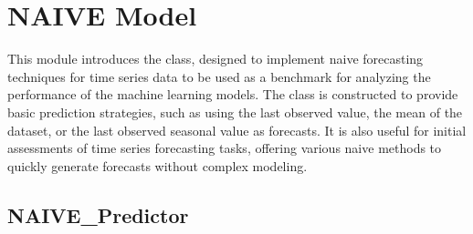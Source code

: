 \documentclass[letterpaper,10pt,english]{sphinxmanual}
\begin{document}
\sphinxstepscope


\section{NAIVE Model}
\label{\detokenize{docs/NAIVE_model:naive-model}}\label{\detokenize{docs/NAIVE_model::doc}}
\sphinxAtStartPar
This module introduces the  class, designed to implement naive forecasting
techniques for time series data to be used as a benchmark for analyzing the performance of the machine learning models.
The class is constructed to provide basic prediction strategies, such as using the last observed value,
the mean of the dataset, or the last observed seasonal value as forecasts.
It is also useful for initial assessments of time series forecasting tasks,
offering various naive methods to quickly generate forecasts without complex modeling.


\subsection{NAIVE\_Predictor}
\label{\detokenize{docs/NAIVE_model:module-NAIVE_model}}\label{\detokenize{docs/NAIVE_model:naive-predictor}}
\end{document}
